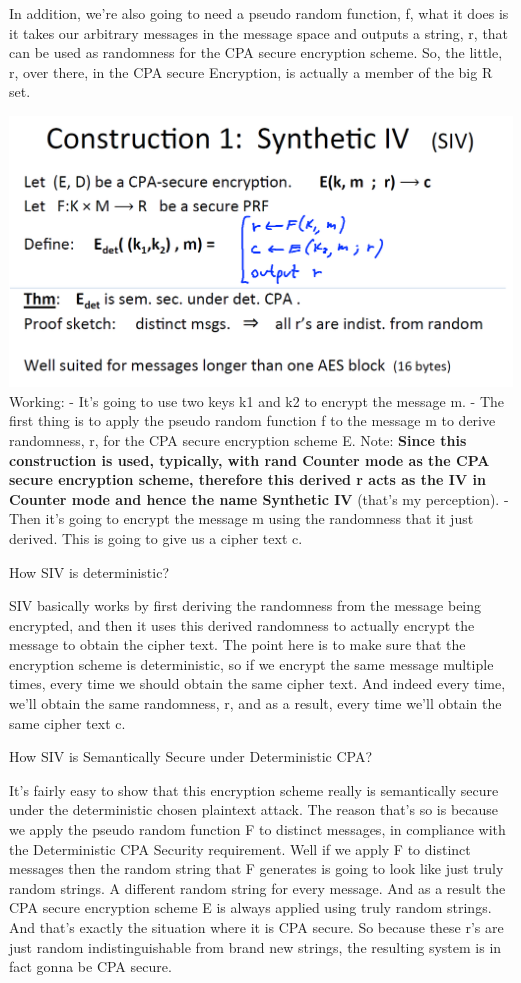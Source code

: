 \documentclass[11pt]{article}
\makeatletter
\def\maxwidth{\ifdim\Gin@nat@width>\linewidth\linewidth
    \else\Gin@nat@width\fi}
\let\Oldincludegraphics\includegraphics
\renewcommand{\includegraphics}[1]{\Oldincludegraphics[width=.8\maxwidth]{#1}}
\makeatother
\begin{document}
In addition, we're also going to need a pseudo random function, f, what
it does is it takes our arbitrary messages in the message space and
outputs a string, r, that can be used as randomness for the CPA secure
encryption scheme. So, the little, r, over there, in the CPA secure
Encryption, is actually a member of the big R set.

\includegraphics{./Images/SIV.png} Working: - It's going to use two keys
k1 and k2 to encrypt the message m. - The first thing is to apply the
pseudo random function f to the message m to derive randomness, r, for
the CPA secure encryption scheme E. Note: \textbf{Since this
construction is used, typically, with rand Counter mode as the CPA
secure encryption scheme, therefore this derived r acts as the IV in
Counter mode and hence the name Synthetic IV} (that's my perception). -
Then it's going to encrypt the message m using the randomness that it
just derived. This is going to give us a cipher text c.

How SIV is deterministic?

SIV basically works by first deriving the randomness from the message
being encrypted, and then it uses this derived randomness to actually
encrypt the message to obtain the cipher text. The point here is to make
sure that the encryption scheme is deterministic, so if we encrypt the
same message multiple times, every time we should obtain the same cipher
text. And indeed every time, we'll obtain the same randomness, r, and as
a result, every time we'll obtain the same cipher text c.

How SIV is Semantically Secure under Deterministic CPA?

It's fairly easy to show that this encryption scheme really is
semantically secure under the deterministic chosen plaintext attack. The
reason that's so is because we apply the pseudo random function F to
distinct messages, in compliance with the Deterministic CPA Security
requirement. Well if we apply F to distinct messages then the random
string that F generates is going to look like just truly random strings.
A different random string for every message. And as a result the CPA
secure encryption scheme E is always applied using truly random strings.
And that's exactly the situation where it is CPA secure. So because
these r's are just random indistinguishable from brand new strings, the
resulting system is in fact gonna be CPA secure.
\end{document}
